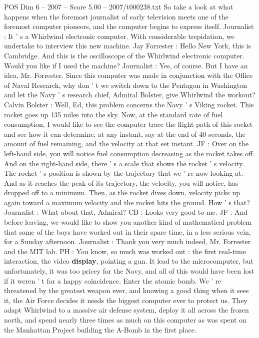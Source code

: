 \begin{textsample}{POS Dim 6 – 2007 – Score 5.00 – 2007/t000238.txt}
So take a look at what happens when the foremost journalist of early television meets one of the foremost computer pioneers, and the computer begins to express itself.
Journalist : It ' s a Whirlwind electronic computer.
With considerable trepidation, we undertake to interview this new machine.
Jay Forrester : Hello New York, this is Cambridge.
And this is the oscilloscope of the Whirlwind electronic computer.
Would you like if I used the machine?
Journalist : Yes, of course.
But I have an idea, Mr.
Forrester.
Since this computer was made in conjunction with the Office of Naval Research, why don ' t we switch down to the Pentagon in Washington and let the Navy ' s research chief, Admiral Bolster, give Whirlwind the workout?
Calvin Bolster : Well, Ed, this problem concerns the Navy ' s Viking rocket.
This rocket goes up 135 miles into the sky.
Now, at the standard rate of fuel consumption, I would like to see the computer trace the flight path of this rocket and see how it can determine, at any instant, say at the end of 40 seconds, the amount of fuel remaining, and the velocity at that set instant.
JF : Over on the left-hand side, you will notice fuel consumption decreasing as the rocket takes off.
And on the right-hand side, there ' s a scale that shows the rocket ' s velocity.
The rocket ' s position is shown by the trajectory that we ' re now looking at.
And as it reaches the peak of its trajectory, the velocity, you will notice, has dropped off to a minimum.
Then, as the rocket dives down, velocity picks up again toward a maximum velocity and the rocket hits the ground.
How ' s that?
Journalist : What about that, Admiral?
CB : Looks very good to me.
JF : And before leaving, we would like to show you another kind of mathematical problem that some of the boys have worked out in their spare time, in a less serious vein, for a Sunday afternoon.
Journalist : Thank you very much indeed, Mr.
Forrester and the MIT lab.
PH : You know, so much was worked out : the first real-time interaction, the video \textbf{display}, pointing a gun.
It lead to the microcomputer, but unfortunately, it was too pricey for the Navy, and all of this would have been lost if it weren ' t for a happy coincidence.
Enter the atomic bomb.
We ' re threatened by the greatest weapon ever, and knowing a good thing when it sees it, the Air Force decides it needs the biggest computer ever to protect us.
They adapt Whirlwind to a massive air defense system, deploy it all across the frozen north, and spend nearly three times as much on this computer as was spent on the Manhattan Project building the A-Bomb in the first place.

\end{textsample}
